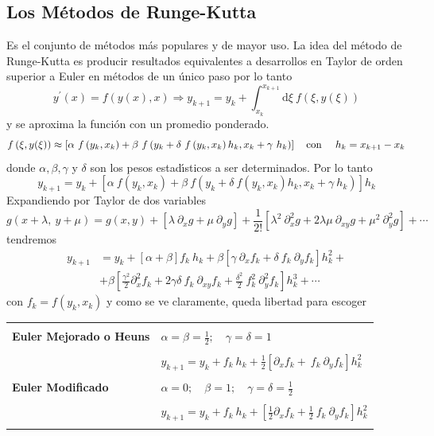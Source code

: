 \documentclass[spanish,titlepage,11pt]{article}
\begin{document}
\subsection{Los M\'{e}todos de Runge-Kutta}

Es el conjunto de m\'{e}todos m\'{a}s populares y de mayor uso. La idea del
m\'{e}todo de Runge-Kutta es producir resultados equivalentes a desarrollos en
Taylor de orden superior a Euler en m\'{e}todos de un \'{u}nico paso por lo
tanto
\[
y^{\prime}(x)=f(y(x),x)\Rightarrow y_{k+1}=y_{k}+\int_{x_{k}}^{x_{k+1}%
}\mathrm{d}\xi\ f\left(  \xi,y(\xi)\right)
\]
y se aproxima la funci\'{o}n con un promedio ponderado.
\[
f\left(  \xi,y(\xi)\right)  \approx\left[  \alpha\ f\left(  y_{k}%
,x_{k}\right)  +\beta\ f\left(  y_{k}+\delta\ f\left(  y_{k},x_{k}\right)
h_{k},x_{k}+\gamma\ h_{k}\right)  \right]  \quad\text{con\ \quad}h_{k}%
=x_{k+1}-x_{k}
\]
donde $\alpha,\beta,\gamma$ y $\delta$ son los pesos estad\'{\i}sticos a ser
determinados. Por lo tanto
\[
y_{k+1}=y_{k}+\left[  \alpha\ f\left(  y_{k},x_{k}\right)  +\beta\ f\left(
y_{k}+\delta\ f\left(  y_{k},x_{k}\right)  h_{k},x_{k}+\gamma\ h_{k}\right)
\right]  h_{k}
\]
Expandiendo por Taylor de dos variables
\[
g\left(  x+\lambda,\ y+\mu\right)  =g\left(  x,y\right)  +\left[
\lambda\ \partial_{x}g+\mu\ \partial_{y}g\right]  +\frac{1}{2!}\left[
\lambda^{2}\ \partial_{x}^{2}g+2\lambda\mu\ \partial_{xy}g+\mu^{2}%
\ \partial_{y}^{2}g\right]  +\cdots
\]
tendremos
\begin{align*}
y_{k+1}  &  =y_{k}+\left[  \alpha+\beta\right]  f_{k}\ h_{k}+\beta\left[
\gamma\ \partial_{x}f_{k}+\delta\ f_{k}\ \partial_{y}f_{k}\right]  h_{k}%
^{2}+\\
&  +\beta\left[  \frac{\gamma^{2}}{2}\partial_{x}^{2}f_{k}+2\gamma
\delta\ f_{k}\ \partial_{xy}f_{k}+\frac{\delta^{2}}{2}\ f_{k}^{2}%
\ \partial_{y}^{2}f_{k}\right]  h_{k}^{3}+\cdots
\end{align*}
con $f_{k}=f\left(  y_{k},x_{k}\right)  $ y como se ve claramente, queda
libertad para escoger\newline
\begin{tabular}
[c]{ll}%
& \\
\textbf{Euler Mejorado o Heuns} & $\alpha=\beta=\frac{1}{2};\quad\gamma
=\delta=1$\\
& \\
& $y_{k+1}=y_{k}+f_{k}\ h_{k}+\frac{1}{2}\left[  \partial_{x}f_{k}%
+\ f_{k}\ \partial_{y}f_{k}\right]  h_{k}^{2}$\\
& \\
\textbf{Euler Modificado} & $\alpha=0;\quad\beta=1;\quad\gamma=\delta=\frac
{1}{2}$\\
& \\
& $y_{k+1}=y_{k}+f_{k}\ h_{k}+\left[  \frac{1}{2}\partial_{x}f_{k}+\frac{1}%
{2}\ f_{k}\ \partial_{y}f_{k}\right]  h_{k}^{2}$\\
&
\end{tabular}
\end{document}
